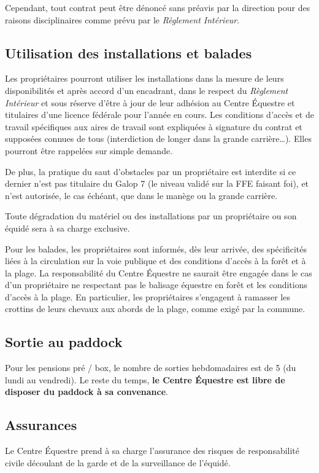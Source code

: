 \documentclass[11pt,a4paper]{article}
\begin{document}
   Cependant, tout contrat peut être dénoncé sans préavis par la direction pour des raisons disciplinaires comme prévu par le \textit{Règlement Intérieur}.

   \subsection*{Utilisation des installations et balades}
   Les propriétaires pourront utiliser les installations dans la mesure de leurs disponibilités et après accord d'un encadrant, dans le respect du \textit{Règlement Intérieur} et sous réserve d'être à jour de leur adhésion au Centre Équestre et titulaires d'une licence fédérale pour l'année en cours.
   Les conditions d'accès et de travail spécifiques aux aires de travail sont expliquées à signature du contrat et supposées connues de tous (interdiction de longer dans la grande carrière\dots).
   Elles pourront être rappelées sur simple demande.

   De plus, la pratique du saut d'obstacles par un propriétaire est interdite si ce dernier n'est pas titulaire du Galop 7 (le niveau validé sur la FFE faisant foi), et n'est autorisée, le cas échéant, que dans le manège ou la grande carrière.

   Toute dégradation du matériel ou des installations par un propriétaire ou son équidé sera à sa charge exclusive.

   Pour les balades, les propriétaires sont informés, dès leur arrivée, des spécificités liées à la circulation sur la voie publique et des conditions d'accès à la forêt et à la plage.
   La responsabilité du Centre Équestre ne saurait être engagée dans le cas d'un propriétaire ne respectant pas le balisage équestre en forêt et les conditions d'accès à la plage.
   En particulier, les propriétaires s'engagent à ramasser les crottins de leurs chevaux aux abords de la plage, comme exigé par la commune.

   \subsection*{Sortie au paddock}
   Pour les pensions pré / box, le nombre de sorties hebdomadaires est de 5 (du lundi au vendredi).
   Le reste du temps, \textbf{le Centre Équestre est libre de disposer du paddock à sa convenance}.

   \subsection*{Assurances}
   Le Centre Équestre prend à sa charge l'assurance des risques de responsabilité civile découlant de la garde et de la surveillance de l'équidé.
\end{document}
